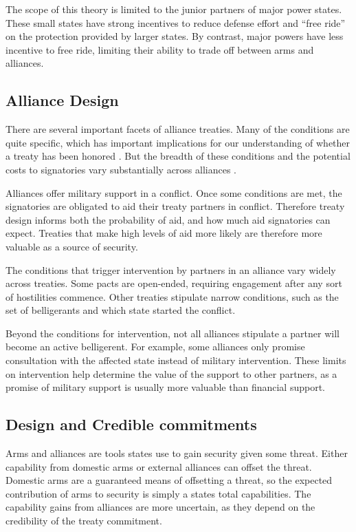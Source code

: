 \documentclass[12pt]{article}
\begin{document}
The scope of this theory is limited to the junior partners of major power states. These small states have strong incentives to reduce defense effort and ``free ride'' on the protection provided by larger states. By contrast, major powers have less incentive to free ride, limiting their ability to trade off between arms and alliances. 


\subsection*{Alliance Design}

There are several important facets of alliance treaties. Many of the conditions are quite specific, which has important implications for our understanding of whether a treaty has been honored \citep{Leedsetal2000}. But the breadth of these conditions and the potential costs to signatories vary substantially across alliances \citep{BensonClinton2016}. 

Alliances offer military support in a conflict. Once some conditions are met, the signatories are obligated to aid their treaty partners in conflict. Therefore treaty design informs both the probability of aid, and how much aid signatories can expect. Treaties that make high levels of aid more likely are therefore more valuable as a source of security. 

The conditions that trigger intervention by partners in an alliance vary widely across treaties. Some pacts are open-ended, requiring engagement after any sort of hostilities commence. Other treaties stipulate narrow conditions, such as the set of belligerants and which state started the conflict.

Beyond the conditions for intervention, not all alliances stipulate a partner will become an active belligerent. For example, some alliances only promise consultation with the affected state instead of military intervention. These limits on intervention help determine the value of the support to other partners, as a promise of military support is usually more valuable than financial support. 

\subsection*{Design and Credible commitments}

Arms and alliances are tools states use to gain security given some threat. Either capability from domestic arms or external alliances can offset the threat. Domestic arms are a guaranteed means of offsetting a threat, so the expected contribution of arms to security is simply a states total capabilities. The capability gains from alliances are more uncertain, as they depend on the credibility of the treaty commitment. 
\end{document}
